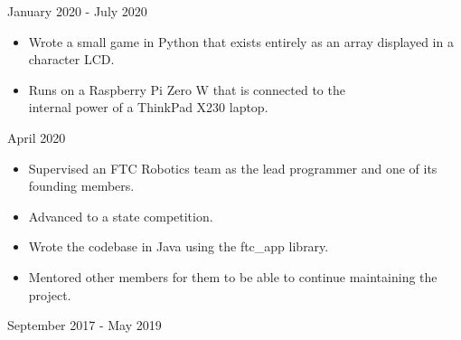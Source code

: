 \documentclass[11pt,letterpaper,ragged2e]{altacv}
\begin{document}
{January 2020 - July 2020}

{
\begin{itemize}
    \item Wrote a small game in Python that exists entirely as an array displayed in a character LCD.
    \item Runs on a Raspberry Pi Zero W that is connected to the \\ internal power of a ThinkPad X230 laptop.
\end{itemize}
}
{April 2020}

{}

{
\begin{itemize}
    \item Supervised an FTC Robotics team as the lead programmer and one of its founding members.
    \item Advanced to a state competition.
    \item Wrote the codebase in Java using the ftc\_app library.
    \item Mentored other members for them to be able to continue maintaining the project.
\end{itemize}
}
{September 2017 - May 2019}



\end{document}

